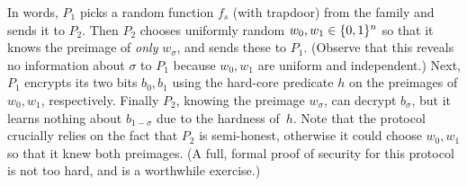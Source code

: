 \documentclass[11pt]{article}
\begin{document}
In words, $P_1$ picks a random function $f_s$ (with trapdoor) from the
family and sends it to $P_2$.  Then $P_2$ chooses uniformly random
$w_{0}, w_{1} \in \{0,1\}^{n}$ so that it knows the preimage of
\emph{only} $w_{\sigma}$, and sends these to $P_{1}$.  (Observe that
this reveals no information about $\sigma$ to $P_{1}$ because $w_{0},
w_{1}$ are uniform and independent.)  Next, $P_{1}$ encrypts its two
bits $b_{0}, b_{1}$ using the hard-core predicate $h$ on the preimages
of $w_{0}, w_{1}$, respectively.  Finally $P_{2}$, knowing the
preimage $w_{\sigma}$, can decrypt $b_{\sigma}$, but it learns nothing
about $b_{1-\sigma}$ due to the hardness of~$h$.  Note that the
protocol crucially relies on the fact that $P_{2}$ is semi-honest,
otherwise it could choose $w_{0}, w_{1}$ so that it knew both
preimages.  (A full, formal proof of security for this protocol is not
too hard, and is a worthwhile exercise.)
 
\end{document}
